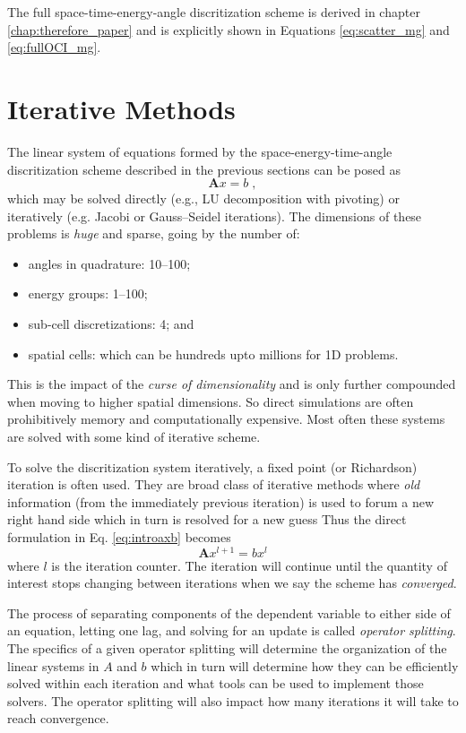 The full space-time-energy-angle discritization scheme is derived in chapter \ref{chap:therefore_paper} and is explicitly shown in Equations \eqref{eq:scatter_mg} and \eqref{eq:fullOCI_mg}.

\section{Iterative Methods}

The linear system of equations formed by the space-energy-time-angle discritization scheme described in the previous sections can be posed as
\begin{equation}
\label{eq:introaxb}
    \bm{A}x=b \; ,
\end{equation}
which may be solved directly (e.g., LU decomposition with pivoting) or iteratively (e.g. Jacobi or Gauss--Seidel iterations).
The dimensions of these problems is \emph{huge} and sparse, going by the number of:
\begin{itemize}
    \item angles in quadrature: \num{10}--\num{100};
    \item energy groups: \num{1}--\num{100};
    \item sub-cell discretizations: 4; and
    \item spatial cells: which can be hundreds upto millions for 1D problems.
\end{itemize}
This is the impact of the \emph{curse of dimensionality} and is only further compounded when moving to higher spatial dimensions. 
So direct simulations are often prohibitively memory and computationally expensive.
Most often these systems are solved with some kind of iterative scheme.

To solve the discritization system iteratively, a fixed point (or Richardson) iteration is often used.
They are broad class of iterative methods where \emph{old} information (from the immediately previous iteration) is used to forum a new right hand side which in turn is resolved for a new guess
Thus the direct formulation in Eq. \eqref{eq:introaxb} becomes
\begin{equation}
    \bm{A}x^{l+1} = b x^{l}
\end{equation}
where $l$ is the iteration counter.
The iteration will continue until the quantity of interest stops changing between iterations when we say the scheme has \emph{converged}.

The process of separating components of the dependent variable to either side of an equation, letting one lag, and solving for an update is called \emph{operator splitting}.
The specifics of a given operator splitting will determine the organization of the linear systems in $A$ and $b$ which in turn will determine how they can be efficiently solved within each iteration and what tools can be used to implement those solvers.
The operator splitting will also impact how many iterations it will take to reach convergence.

